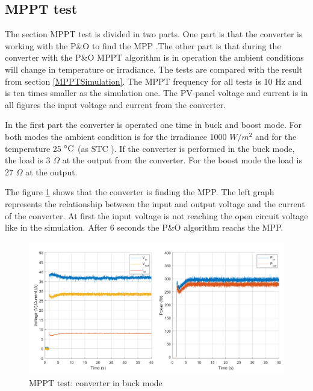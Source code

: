 \subsection{MPPT test}
The section MPPT test is divided in two parts. One part is that the converter is working with the P\&O to find the MPP .The other part is that during the converter with the P\&O MPPT algorithm is in operation the ambient conditions will change in temperature or irradiance. The tests are compared with the result from section \ref{MPPTSimulation}. The MPPT frequency for all tests is 10 Hz and is ten times smaller as the simulation one. The PV-panel voltage and current is in all figures the input voltage and current from the converter.

In the first part the converter is operated one time in buck and boost mode. For both modes the ambient condition is for the irradiance 1000 $W /m^2$ and for the temperature 25 $\decC$ (as STC ). If the converter is performed in the buck mode, the load is 3 $\Omega$ at the output from the converter. For the boost mode the load is 27 $\Omega$ at the output.

The figure \ref{MPPTtestbuckmode} shows that the converter is finding the MPP. The left graph represents the relationship between the input and output voltage and the current of the converter. At first the input voltage is not reaching the open circuit voltage like in the simulation.  After 6 seconds the P\&O algorithm reachs the MPP. 

\begin{figure}[H]
	\begin{center}
		\includegraphics[width=1\textwidth]{../Pictures/P1/Test/Buck_mode_MPPT_Vin_Vout_Iin_Pin_Pout}
		\caption{MPPT test: converter in buck mode}
		\label{MPPTtestbuckmode}
	\end{center}	
\end{figure}


